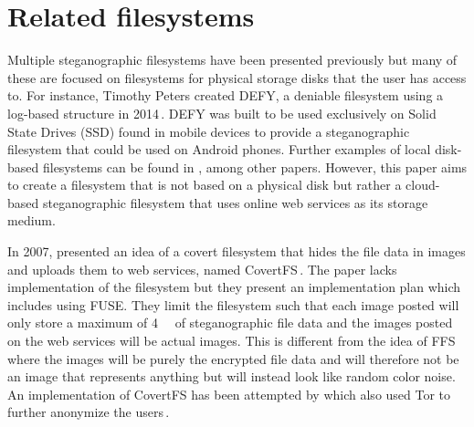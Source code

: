 \section{Related filesystems}
Multiple steganographic filesystems have been presented previously but many of these are focused on filesystems for physical storage disks that the user has access to. For instance, Timothy Peters created DEFY, a deniable filesystem using a log-based structure in 2014\,\cite{petersDEFYDeniableFile2014}. DEFY was built to be used exclusively on Solid State Drives (SSD) found in mobile devices to provide a steganographic filesystem that could be used on Android phones. Further examples of local disk-based filesystems can be found in \cite{andersonSteganographicFileSystem1998, mcdonaldStegFSSteganographicFile2000, domingo-ferrerSharedSteganographicFile2008, hanMultiuserSteganographicFile2010}, among other papers. However, this paper aims to create a filesystem that is not based on a physical disk but rather a cloud-based steganographic filesystem that uses online web services as its storage medium. 

In 2007, \citeauthor{baliga2007web} presented an idea of a covert filesystem that hides the file data in images and uploads them to web services, named CovertFS\,\cite{baliga2007web}. The paper lacks implementation of the filesystem but they present an implementation plan which includes using FUSE. They limit the filesystem such that each image posted will only store a maximum of \SI{4}{\kilo\byte} of steganographic file data and the images posted on the web services will be actual images. This is different from the idea of FFS where the images will be purely the encrypted file data and will therefore not be an image that represents anything but will instead look like random color noise. An implementation of CovertFS has been attempted by \citeauthor{sosaSuperSecretFile2007} which also used Tor to further anonymize the users\,\cite{sosaSuperSecretFile2007}.

